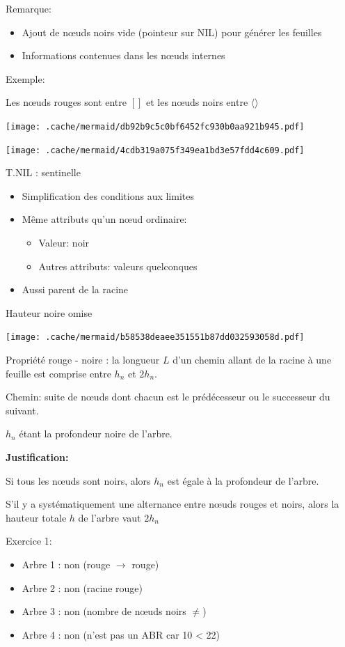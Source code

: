 Remarque:

\begin{itemize}
\tightlist
\item
  Ajout de nœuds noirs vide (pointeur sur NIL) pour générer les feuilles
\item
  Informations contenues dans les nœuds internes
\end{itemize}

Exemple:

Les nœuds rouges sont entre \([ ]\) et les nœuds noirs entre
\(\langle \rangle\)

\texttt{[image: .cache/mermaid/db92b9c5c0bf6452fc930b0aa921b945.pdf]}

\texttt{[image: .cache/mermaid/4cdb319a075f349ea1bd3e57fdd4c609.pdf]}

T.NIL : sentinelle

\begin{itemize}
\tightlist
\item
  Simplification des conditions aux limites
\item
  Même attributs qu'un nœud ordinaire:

  \begin{itemize}
  \tightlist
  \item
    Valeur: noir
  \item
    Autres attributs: valeurs quelconques
  \end{itemize}
\item
  Aussi parent de la racine
\end{itemize}

Hauteur noire omise

\texttt{[image: .cache/mermaid/b58538deaee351551b87dd032593058d.pdf]}

Propriété rouge - noire : la longueur \(L\) d'un chemin allant de la
racine à une feuille est comprise entre \(h_n\) et \(2h_n\).

Chemin: suite de nœuds dont chacun est le prédécesseur ou le successeur
du suivant.

\(h_n\) étant la profondeur noire de l'arbre.

\textbf{Justification:}

Si tous les nœuds sont noirs, alors \(h_n\) est égale à la profondeur de
l'arbre.

S'il y a systématiquement une alternance entre nœuds rouges et noirs,
alors la hauteur totale \(h\) de l'arbre vaut \(2h_n\)

Exercice 1:

\begin{itemize}
\tightlist
\item
  Arbre 1 : non (rouge \(\to\) rouge)
\item
  Arbre 2 : non (racine rouge)
\item
  Arbre 3 : non (nombre de nœuds noirs \(\neq\))
\item
  Arbre 4 : non (n'est pas un ABR car 10 \textless{} 22)
\end{itemize}

